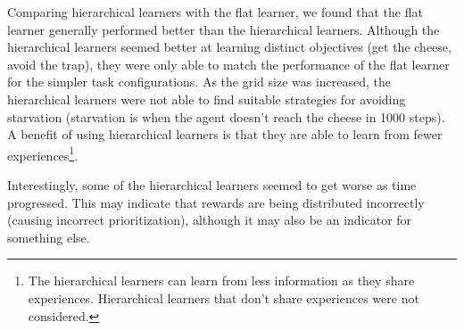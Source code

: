 \documentclass{article}
\begin{document}
	Comparing hierarchical learners with the flat learner, we found that the flat learner generally performed better than the hierarchical learners. Although the hierarchical learners seemed better at learning distinct objectives (get the cheese, avoid the trap), they were only able to match the performance of the flat learner for the simpler task configurations. As the grid size was increased, the hierarchical learners were not able to find suitable strategies for avoiding starvation (starvation is when the agent doesn't reach the cheese in 1000 steps).
	A benefit of using hierarchical learners is that they are able to learn from fewer experiences\footnote{The hierarchical learners can learn from less information as they share experiences. Hierarchical learners that don't share experiences were not considered.}.

	Interestingly, some of the hierarchical learners seemed to get worse as time progressed. This may indicate that rewards are being distributed incorrectly (causing incorrect prioritization), although it may also be an indicator for something else.


\newpage


\newpage
\begin{appendices}


\end{appendices}
\end{document}
